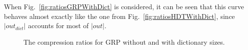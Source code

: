 When Fig.~\ref{fig:ratiosGRPWithDict} is considered, it can be seen that this curve behaves almost exactly like the one from Fig.~\ref{fig:ratiosHDTWithDict}, since $|out_{dict}|$ accounts for most of $|out|$.

\begin{figure}[h]
	\centering
	\hfill
	\caption{The compression ratios for GRP without and with dictionary sizes.}
\end{figure}

